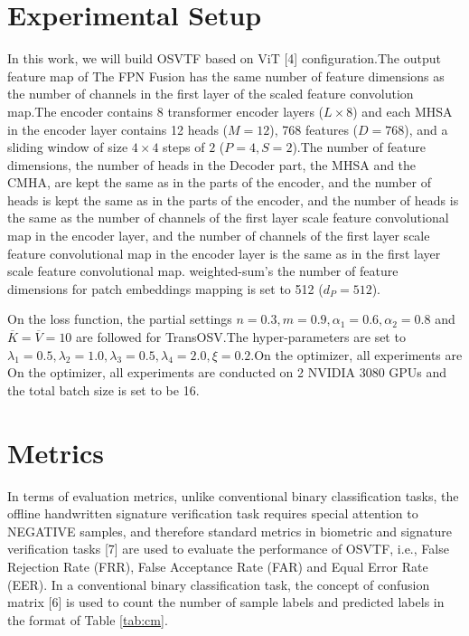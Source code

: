 \section{Experimental Setup}

In this work, we will build OSVTF based on ViT [4] configuration.The output feature map of The FPN Fusion has the same number of feature dimensions as the number of channels in the first layer of the scaled feature convolution map.The encoder contains 8 transformer encoder layers ($L\times 8$) and each MHSA in the encoder layer contains 12 heads ($M=12$), 768 features ($D=768$), and a sliding window of size $4\times 4$ steps of $2$ ($P=4,S=2$).The number of feature dimensions, the number of heads in the Decoder part, the MHSA and the CMHA, are kept the same as in the parts of the encoder, and the number of heads is kept the same as in the parts of the encoder, and the number of heads is the same as the number of channels of the first layer scale feature convolutional map in the encoder layer, and the number of channels of the first layer scale feature convolutional map in the encoder layer is the same as in the first layer scale feature convolutional map. weighted-sum's the number of feature dimensions for patch embeddings mapping is set to 512 ($d_P=512$).

On the loss function, the partial settings $n=0.3,m=0.9,\alpha_1=0.6,\alpha_2=0.8$ and $\overline{K}=\overline{V}=10$ are followed for TransOSV.The hyper-parameters are set to $\lambda_1=0.5,\lambda_2=1.0,\lambda_3=0.5,\lambda_4=2.0,\xi=0.2$.On the optimizer, all experiments are On the optimizer, all experiments are conducted on 2 NVIDIA 3080 GPUs and the total batch size is set to be 16.

\section{Metrics}

In terms of evaluation metrics, unlike conventional binary classification tasks, the offline handwritten signature verification task requires special attention to NEGATIVE samples, and therefore standard metrics in biometric and signature verification tasks [7] are used to evaluate the performance of OSVTF, i.e., False Rejection Rate (FRR), False Acceptance Rate (FAR) and Equal Error Rate (EER). In a conventional binary classification task, the concept of confusion matrix [6] is used to count the number of sample labels and predicted labels in the format of Table \ref{tab:cm}.

